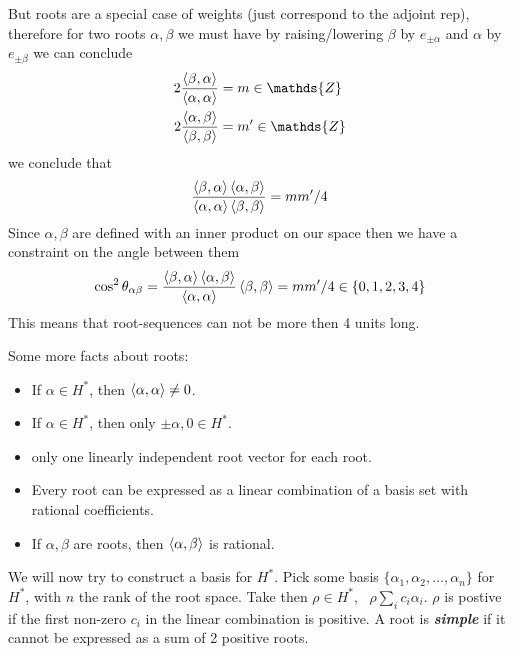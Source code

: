 \documentclass[a4paper,12pt]{article}
\begin{document}
But roots are a special case of weights (just correspond to the adjoint rep), therefore for two roots $\alpha,\beta$ we must have by raising/lowering $\beta$ by $e_{\pm\alpha}$ and $\alpha$ by $e_{\pm\beta}$ we can conclude
\begin{equation}
	\begin{aligned}
		2\frac{\expval{\beta,\alpha}}{\expval{\alpha,\alpha}}&=m\in \mathds{Z}\\
			2\frac{\expval{\alpha,\beta}}{\expval{\beta,\beta}}&=m'\in \mathds{Z}
	\end{aligned}
\end{equation}
we conclude that
\begin{equation}
	\begin{aligned}
		\frac{\expval{\beta,\alpha}\expval{\alpha,\beta}}{\expval{\alpha,\alpha}\expval{\beta,\beta}}&=mm'/4\\
	\end{aligned}
\end{equation}
Since $\alpha,\beta$ are defined with an inner product on our space then we have a constraint on the angle between them
\begin{equation}
	\begin{aligned}
		\cos^2\theta_{\alpha\beta}=\frac{\expval{\beta,\alpha}\expval{\alpha,\beta}}{\expval{\alpha,\alpha}}\expval{\beta,\beta}=mm'/4\in \{0,1,2,3,4\}
	\end{aligned}
\end{equation}
This means that root-sequences can not be more then 4 units long. 

Some more facts about roots:
\begin{itemize}
	\item If $\alpha\in H^*$, then $\expval{\alpha,\alpha}\neq 0$.
	\item If $\alpha\in H^*$, then only $\pm \alpha,0\in H^*$.
	\item \exists only one linearly independent root vector for each root.
	\item Every root can be expressed as a linear combination of a basis set with rational coefficients.
	\item If $\alpha,\beta$ are roots, then $\expval{\alpha,\beta}$ is rational.
\end{itemize}
We will now try to construct a basis for $H^*$. Pick some basis $\{\alpha_1,\alpha_2,\dots,\alpha_n\}$ for $H^*$, with $n$ the rank of the root space. Take then $\rho\in H^*,~~~\rho\sum_i c_i \alpha_i$.  $\rho$ is postive if the first non-zero $c_i$ in the linear combination is positive. A root is \textit{\textbf{simple}} if it cannot be expressed as a sum of 2 positive roots.
\end{document}
